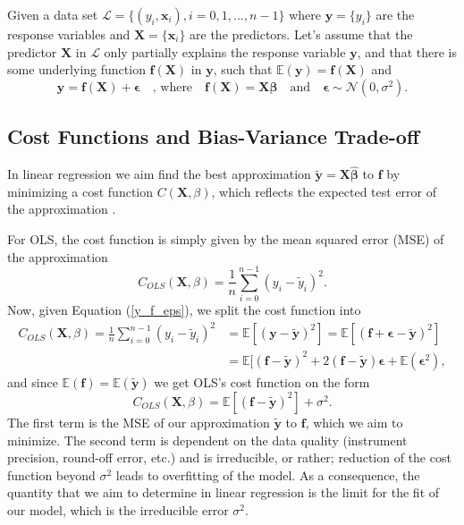 \documentclass[]{article}
\begin{document}
Given a data set $\mathcal{L} = \{(y_i, \mathbf{x}_i), i=0,1,...,n-1\}$ where $\mathbf{y} = \{y_i\}$ are the response variables and $\mathbf{X} = \{\mathbf{x}_i\}$ are the predictors. Let's assume that the predictor $\mathbf{X}$ in $\mathcal{L}$ only partially explains the response variable $\mathbf{y}$, and that there is some underlying function $\mathbf{f}(\mathbf{X})$ in $\mathbf{y}$, such that $\mathbb{E}(\mathbf{y}) = \mathbf{f}(\mathbf{X})$ and
\begin{equation}
\label{y_f_eps}
\mathbf{y} = \mathbf{f}(\mathbf{X}) + \mathbf{\epsilon} \quad \text{, where} \quad \mathbf{f}(\mathbf{X}) = \mathbf{X} \mathbf{\beta} \quad \text{and} \quad \mathbf{\epsilon} \sim \mathcal{N}(0, \sigma^2).
\end{equation}

\subsection{Cost Functions and Bias-Variance Trade-off}
In linear regression we aim find the best approximation $\mathbf{\tilde{y}} = \mathbf{X\hat{\beta}}$ to $\mathbf{f}$ by minimizing a cost function $C(\mathbf{X},\mathbb{\beta})$, which reflects the expected test error of the approximation \cite{james2013introduction}.

For OLS, the cost function is simply given by the mean squared error (MSE) of the approximation
\begin{equation}
\label{cost-ols}
	C_{OLS}(\mathbf{X},\mathbb{\beta}) = \frac{1}{n} \sum_{i=0}^{n-1} (y_i - \tilde{y}_i)^2.
\end{equation}
Now, given Equation (\ref{y_f_eps}), we split the cost function into
\begin{equation*}
\begin{aligned}
	C_{OLS}(\mathbf{X},\mathbb{\beta}) = \frac{1}{n} \sum_{i=0}^{n-1} (y_i - \tilde{y}_i)^2 &= \mathbb{E}[(\mathbf{y} - \mathbf{\tilde{y}})^2] = \mathbb{E}[(\mathbf{f} + \mathbf{\epsilon} - \mathbf{\tilde{y}})^2] \\
	&= \mathbb{E}[(\mathbf{f} - \mathbf{\tilde{y}})^2 + 2(\mathbf{f} - \mathbf{\tilde{y}})\mathbf{\epsilon} + \mathbb{E}(\mathbf{\epsilon}^2),
\end{aligned}
\end{equation*}
and since $\mathbb{E}(\mathbf{f}) = \mathbb{E}(\mathbf{\tilde{y}})$ we get OLS's cost function on the form \cite{james2013introduction}
\begin{equation}
\label{red-irred}
	C_{OLS}(\mathbf{X},\mathbb{\beta}) = \mathbb{E}[(\mathbf{f} - \mathbf{\tilde{y}})^2] + \sigma^2.
\end{equation}
The first term is the MSE of our approximation $\mathbf{\tilde{y}}$ to $\mathbf{f}$, which we aim to minimize. The second term is dependent on the data quality (instrument precision, round-off error, etc.) and is irreducible, or rather; reduction of the cost function beyond $\sigma^2$ leads to overfitting of the model. As a consequence, the quantity that we aim to determine in linear regression is the limit for the fit of our model, which is the irreducible error $\sigma^2$.
\end{document}
